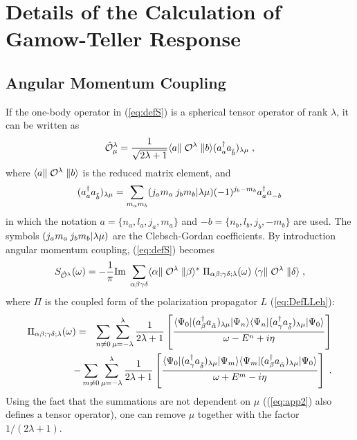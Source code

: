 \chapter{Details of the Calculation of Gamow-Teller Response\label{app:detail}}
\section{Angular Momentum Coupling}
If the one-body operator in (\ref{eq:defS}) 
is a spherical tensor operator\cite{Ed57}
of rank $\lambda$, it can be written as
%
	\begin{equation}
		\opO^\lambda_\mu 
	=
		\frac{1}{\sqrt{2\lambda+1}}
		\RME< a|\opOhatless^\lambda|b>
		(\Oc{a} \Oa{\tilde{b}})_{\lambda\mu}
	\label{eq:app1}
	\;,
	\end{equation}
%
where $\RME< a |\opOhatless^\lambda|b >$ is the reduced matrix element,
 and
%
	\begin{equation}
		(\Oc{a} \Oa{\tilde{b}})_{\lambda\mu}
	=
		\sum_{m_a m_b}
		\CG( j_a, m_a, j_b, m_b, \lambda, \mu )
		(-1)^{j_b - m_b}
		\Oc{a} \Oa{-b}
	\label{eq:app2}
	\end{equation}
%
in which the notation $a=\{n_a,l_a,j_a,m_a\}$ and $-b=\{n_b,l_b,j_b,-m_b\}$ are 
used. The symbols $\CG( j_a, m_a, j_b, m_b, \lambda, \mu )$ are the 
Clebsch-Gordan coefficients.
By introduction angular momentum coupling, (\ref{eq:defS}) becomes
%
	\begin{equation}
		S_{\opO^\lambda}(\omega)
	=
		-\frac{1}{\pi} {\rm Im} 
	\; 
		\sum_{\alpha\beta\gamma\delta}
		\RME<\alpha |\opOhatless^\lambda |\beta >^*
	\;
		\Pi_{\alpha\beta;\gamma\delta;\lambda}(\omega)
	\;
		\RME<\gamma |\opOhatless^\lambda |\delta >
	\;,
	\label{eq:app3}
	\end{equation}
%
where $\Pi$ is the coupled form of the polarization propagator $L$ 
(\ref{eq:DefLLeh}):
%
	\begin{eqnarray}
		\Pi_{\alpha\beta;\gamma\delta;\lambda}(\omega)
	&=&
		\sum_{n\not=0}
		\sum_{\mu=-\lambda}^{\lambda}
		\frac{1}{2\lambda+1}
		\left[
			\frac{
			\ME<\Psi_0|
				(\Oc{\beta} \Oa{\tilde{\alpha}})_{\lambda\mu}
			|\Psi_n >
			\ME<\Psi_n|
				(\Oc{\gamma} \Oa{\tilde{\delta}})_{\lambda\mu}
			|\Psi_0 >
    			}{
			\omega-E^n+i\eta
    			}
		\right] 
	\nonumber \\
	&&
	\hspace{-2cm}
	-
		\sum_{m\not=0}
		\sum_{\mu=-\lambda}^{\lambda}
		\frac{1}{2\lambda+1}
		\left[
			\frac{
			\ME<\Psi_0|
				(\Oc{\gamma} \Oa{\tilde{\delta}})_{\lambda\mu}
			|\Psi_m>
			\ME<\Psi_m|
				(\Oc{\beta} \Oa{\tilde{\alpha}})_{\lambda\mu}
			|\Psi_0>
			}{
			\omega+E^m-i\eta
			}
		\right]
	\;.
	\label{eq:app4}
	\end{eqnarray}
%
Using the fact that the summations are not dependent on $\mu$  
((\ref{eq:app2}) also defines a tensor operator), one can remove 
$\mu$ together with the factor $1/(2\lambda+1)$.

